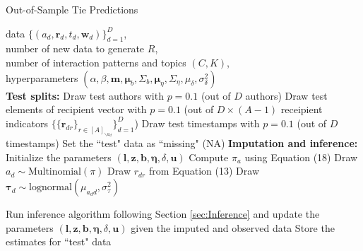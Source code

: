 \documentclass{article}
\begin{document}
 	   \begin{algorithm}[H]
 	   	\caption{Out-of-Sample Tie Predictions}
 	   	\label{alg:PPE}
 	   	\begin{algorithmic}
 	   		 data $ \{ (a_d, \boldsymbol{r}_d, t_d,  \boldsymbol{w}_d)\}_{d=1}^D$, \\
 	   		number of new data to generate $R$,\\
 	   		number of interaction patterns and topics $(C, K)$,\\
 	   		hyperparameters $(\alpha, \beta, \boldsymbol{m}, \boldsymbol{\mu}_b, \Sigma_b, \boldsymbol{\mu}_\eta, \Sigma_\eta, {\mu}_\delta,\sigma^2_\delta)$\\
 	   		\vskip 0.1in
 	   		\textbf{Test splits:}	
 	   		\STATE Draw test authors with $p=0.1$ (out of $D$ authors) 
 	   		\STATE Draw test elements of recipient vector 
 	   		with $p=0.1$ (out of $D\times (A-1)$ receipient indicators $\{\{\boldsymbol{r}_{dr}\}_{r\in [A]_{\backslash a_d}}\}_{d=1}^D$)
 	   		\STATE Draw test timestamps with $p=0.1$  (out of $D$ timestamps) 
 	   		\STATE Set the ``test" data as ``missing" (NA)
 	   		\vskip 0.1in
 	   		\textbf{Imputation and inference:}	
 	   		\STATE Initialize the parameters $(\boldsymbol{l}, \boldsymbol{z}, \boldsymbol{b}, \boldsymbol{\eta},\delta, \boldsymbol{u})$
 	   		\STATE Compute $\pi_{a} $ using Equation (18)
 	   		\ENDFOR
 	   		\STATE Draw $a_d \sim \mbox{Multinomial}(\pi)$
 	   		\ENDIF
 	   		\STATE Draw $r_{dr}$ from Equation (13)
 	   		\ENDIF
 	   		\ENDFOR
 	   		\STATE Draw $\boldsymbol{\tau}_d \sim \mbox{lognormal}(\mu_{a_dd}, \sigma^2_\tau)$
 	   		\ENDIF
 	   		
 	   		\vskip 0.1in		
 	   		\STATE Run inference algorithm following Section \ref{sec:Inference} and update the parameters $(\boldsymbol{l}, \boldsymbol{z}, \boldsymbol{b}, \boldsymbol{\eta},\delta, \boldsymbol{u})$ given the imputed and observed data
 	   		\ENDFOR
 	   		\STATE Store the estimates for ``test" data
 	   		\ENDFOR
 	   	\end{algorithmic}
 	   \end{algorithm}
 	   
\end{document}
